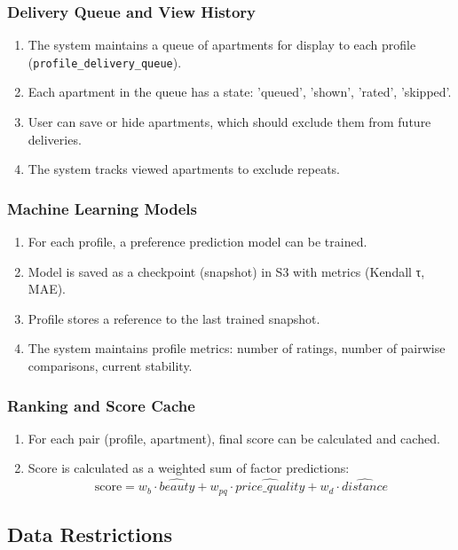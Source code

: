 \documentclass[12pt,a4paper]{article}
\begin{document}
\subsubsection{Delivery Queue and View History}
\begin{enumerate}
    \item The system maintains a queue of apartments for display to each profile (\texttt{profile\_delivery\_queue}).
    \item Each apartment in the queue has a state: 'queued', 'shown', 'rated', 'skipped'.
    \item User can save or hide apartments, which should exclude them from future deliveries.
    \item The system tracks viewed apartments to exclude repeats.
\end{enumerate}

\subsubsection{Machine Learning Models}
\begin{enumerate}
    \item For each profile, a preference prediction model can be trained.
    \item Model is saved as a checkpoint (snapshot) in S3 with metrics (Kendall τ, MAE).
    \item Profile stores a reference to the last trained snapshot.
    \item The system maintains profile metrics: number of ratings, number of pairwise comparisons, current stability.
\end{enumerate}

\subsubsection{Ranking and Score Cache}
\begin{enumerate}
    \item For each pair (profile, apartment), final score can be calculated and cached.
    \item Score is calculated as a weighted sum of factor predictions: 
    $$\text{score} = w_b \cdot \hat{beauty} + w_{pq} \cdot \hat{price\_quality} + w_d \cdot \hat{distance}$$
\end{enumerate}

\subsection{Data Restrictions}
\end{document}
